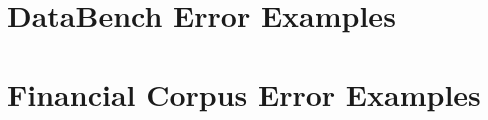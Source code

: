 
\section{DataBench Error Examples}
\label{sec:databench_error_ex}









\section{Financial Corpus Error Examples}
\label{sec:financial_error_ex}

